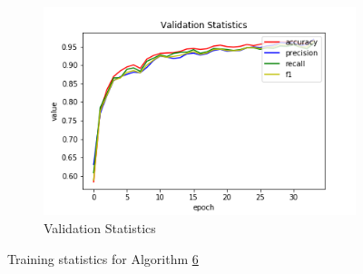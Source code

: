 \begin{figure}[h!]
\begin{subfigure}[b]{0.35\linewidth}
    \includegraphics[width=\linewidth]{images/cae_online_lstm/caelstm_section_lstm_training_uniform_random_fill_10000_model_validation_stats.png}
     \caption{Validation Statistics}
  \end{subfigure}
  \caption{Training statistics for Algorithm \hyperref[tab: app_evalalgorithms]{6}}
  \label{fig: train_olnine_lstm_6}
\end{figure}

